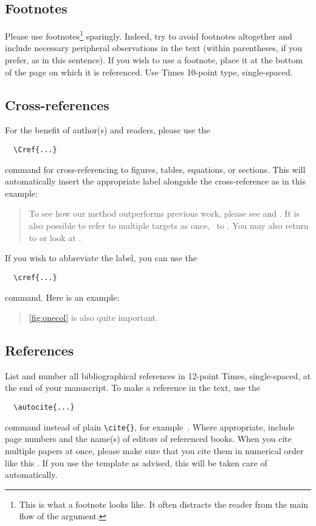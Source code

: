 \subsection{Footnotes}

Please use footnotes\footnote{This is what a footnote looks like.
It often distracts the reader from the main flow of the argument.} sparingly.
Indeed, try to avoid footnotes altogether and include necessary peripheral observations in the text (within parentheses, if you prefer, as in this sentence).
If you wish to use a footnote, place it at the bottom of the page on which it is referenced.
Use Times 10-point type, single-spaced.

\subsection{Cross-references}

For the benefit of author(s) and readers, please use the
{\small\begin{verbatim}
  \Cref{...}
\end{verbatim}}  command for cross-referencing to figures, tables, equations, or sections.
This will automatically insert the appropriate label alongside the cross-reference as in this example:
\begin{quotation}
  To see how our method outperforms previous work, please see  and .
  It is also possible to refer to multiple targets as once, \eg~to .
  You may also return to  or look at .
\end{quotation}
If you wish to abbreviate the label, you can use the
{\small\begin{verbatim}
  \cref{...}
\end{verbatim}}
command. Here is an example:
\begin{quotation}
  \cref{fig:onecol} is also quite important.
\end{quotation}

\subsection{References}

List and number all bibliographical references in 12-point Times, single-spaced, at the end of your manuscript.
To make a reference in the text, use the
{\small\begin{verbatim}
  \autocite{...}
\end{verbatim}} command instead of plain \verb`\cite{}`, for example~\autocite{Authors14}.
Where appropriate, include page numbers and the name(s) of editors of referenced books.
When you cite multiple papers at once, please make sure that you cite them in numerical order like this \autocite{Alpher02,Alpher03,Alpher05,Authors14b,Authors14}.
If you use the template as advised, this will be taken care of automatically.


